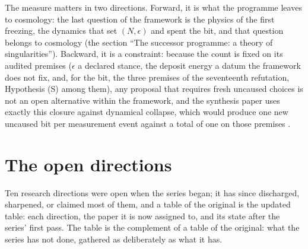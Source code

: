 \documentclass[11pt]{article}
\theoremstyle{definition}
\theoremstyle{plain}
\begin{document}
The measure matters in two directions. Forward, it is what the programme leaves to cosmology: the last question of the framework is the physics of the first freezing, the dynamics that set $(N, \epsilon)$ and spent the bit, and that question belongs to cosmology (the section ``The successor programme: a theory of singularities''). Backward, it is a constraint: because the count is fixed on its audited premises ($\epsilon$ a declared stance, the deposit energy a datum the framework does not fix, and, for the bit, the three premises of the seventeenth refutation, Hypothesis (S) among them), any proposal that requires fresh uncaused choices is not an open alternative within the framework, and the synthesis paper uses exactly this closure against dynamical collapse, which would produce one new uncaused bit per measurement event against a total of one on those premises \cite{ButlerT16}.

\section{The open directions}

\label{c:note.programme.setting-open-directions}
Ten research directions were open when the series began; it has since discharged, sharpened, or claimed most of them, and a table of the original is the updated table: each direction, the paper it is now assigned to, and its state after the series' first pass. The table is the complement of a table of the original: what the series has not done, gathered as deliberately as what it has.
\end{document}
